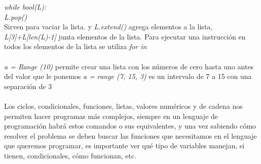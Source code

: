 \documentclass{article}
\begin{document}
\textit{while bool(L):\\
L.pop()}\\
Sirven para vaciar la lista. y \textit{L.extend()}  agrega elementos a la lista, \textit{L[3]+L[len(L)-1]} junta elementos de la lista. Para ejecutar una instrucción en todos los elementos de la lista se utiliza \textit{for in} \\
\\
\textit{a = Range (10)} permite crear una lista con los números de cero hasta uno antes del valor que le ponemos
\textit{a = range (7, 15, 3)} es un intervalo de 7 a 15 con una separación de 3\\
\\
Los ciclos, condicionales, funciones, listas, valores numéricos y de cadena nos permiten hacer programas más complejos, siempre en un lenguaje de programación habrá estos comandos o sus equivalentes, y una vez sabiendo cómo resolver el problema se deben buscar las funciones que necesitamos en el lenguaje que queremos programar, es importante ver qué tipo de variables manejan, si tienen, condicionales, cómo funcionan, etc.\\
\end{document}
